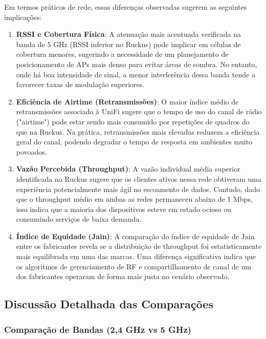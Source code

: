 Em termos práticos de rede, essas diferenças observadas sugerem as seguintes implicações:
\begin{enumerate}
  \item \textbf{RSSI e Cobertura Física}: A atenuação mais acentuada verificada na banda de 5 GHz (RSSI inferior no Ruckus) pode implicar em células de cobertura menores, sugerindo a necessidade de um planejamento de posicionamento de APs mais denso para evitar áreas de sombra. No entanto, onde há boa intensidade de sinal, a menor interferência dessa banda tende a favorecer taxas de modulação superiores.
  \item \textbf{Eficiência de Airtime (Retransmissões)}: O maior índice médio de retransmissões associado à UniFi sugere que o tempo de uso do canal de rádio ("airtime") pode estar sendo mais consumido por repetições de quadros do que na Ruckus. Na prática, retransmissões mais elevadas reduzem a eficiência geral do canal, podendo degradar o tempo de resposta em ambientes muito povoados.
  \item \textbf{Vazão Percebida (Throughput)}: A vazão individual média superior identificada no Ruckus sugere que os clientes ativos nessa rede obtiveram uma experiência potencialmente mais ágil no escoamento de dados. Contudo, dado que o throughput médio em ambas as redes permaneceu abaixo de 1 Mbps, isso indica que a maioria dos dispositivos esteve em estado ocioso ou consumindo serviços de baixa demanda.
  \item \textbf{Índice de Equidade (Jain)}: A comparação do índice de equidade de Jain entre os fabricantes revela se a distribuição de throughput foi estatisticamente mais equilibrada em uma das marcas. Uma diferença significativa indica que os algoritmos de gerenciamento de RF e compartilhamento de canal de um dos fabricantes operaram de forma mais justa no cenário observado.


\end{enumerate}
\subsection{Discussão Detalhada das Comparações}

\subsubsection{Comparação de Bandas (2,4 GHz vs 5 GHz)}

